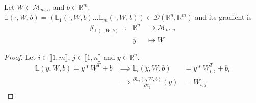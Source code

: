\documentclass[11pt,en]{elegantpaper}
\newcommand{\Real}{\mathbb{R}}
\begin{document}
\begin{proposition}
  {\normalfont
    Let $W \in \mathcal{M}_{m,n}$ and $b \in \Real^m$.
    $\mathbb{L}(\cdot,W,b) = (\mathbb{L}_1(\cdot,W,b) \ldots \mathbb{L}_m(\cdot,W,b)) \in \mathcal{D}(\Real^n, \Real^m)$
    and its gradient is \begin{equation} \label{prop:densel_y_differential}
      \begin{array}{llll}
        \mathcal{J}_{\mathbb{L}(\cdot,W,b)} & : & \Real^n  & \longrightarrow \mathcal{M}_{m,n} \\
        &   & y & \longmapsto W
      \end{array}
    \end{equation}
  }
\end{proposition}

\begin{proof}
  Let $i \in \llbracket 1,m \rrbracket$, $j \in \llbracket 1,n \rrbracket$
  and $y \in \Real^n$. \begin{equation*}
    \begin{array}{lll}
      \mathbb{L}(y,W,b) = y * W^T + b & \implies \mathbb{L}_i(y,W,b) & = y * W_{i,:}^T + b_i \\
      & \implies \frac{\partial \mathbb{L}_i(\cdot,W,b)}{\partial e_j} (y) & = W_{i,j}
    \end{array}
  \end{equation*}
\end{proof}
\end{document}
